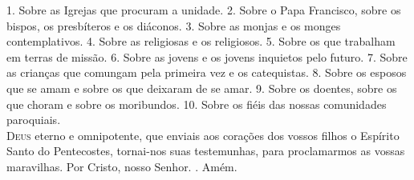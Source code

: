 \documentclass{book}
\begin{document}
\begin{flushleft}
    \vspace{.2cm}
    \newline
    {\color{VioletRed2} 1.} Sobre as Igrejas que procuram a unidade.
    \vspace{.2cm}
    \newline
    {\color{VioletRed2} 2.} Sobre o Papa Francisco, sobre os bispos, os presbíteros e os diáconos.
    \vspace{.2cm}
    \newline
    {\color{VioletRed2} 3.} Sobre as monjas e os monges contemplativos.
    \vspace{.2cm}
    \newline
    {\color{VioletRed2} 4.} Sobre as religiosas e os religiosos.
    \vspace{.2cm}
    \newline
    {\color{VioletRed2} 5.} Sobre os que trabalham em terras de missão.
    \vspace{.2cm}
    \newline
    {\color{VioletRed2} 6.} Sobre as jovens e os jovens inquietos pelo futuro.
    \vspace{.2cm}
    \newline
    {\color{VioletRed2} 7.} Sobre as crianças que comungam pela primeira vez e os catequistas.
    \vspace{.2cm}
    \newline
    {\color{VioletRed2} 8.} Sobre os esposos que se amam e sobre os que deixaram de se amar.
    \vspace{.2cm}
    \newline
    {\color{VioletRed2} 9.} Sobre os doentes, sobre os que choram e sobre os moribundos.
    \vspace{.2cm}
    \newline
    {\color{VioletRed2} 10.} Sobre os fiéis das nossas comunidades paroquiais.
    \vspace{.2cm} \\
    \lettrine[findent=2pt]{\color{VioletRed2}D}{eus} eterno e omnipotente,
    \newline
    que enviais aos corações dos vossos filhos
    \newline
    o Espírito Santo do Pentecostes,
    \newline
    tornai-nos suas testemunhas,
    \newline
    para proclamarmos as vossas maravilhas.
    \newline
    Por Cristo, nosso Senhor.
    \newline
    {\color{VioletRed2} \Rbar.} Amém.
\end{flushleft}
\end{document}
